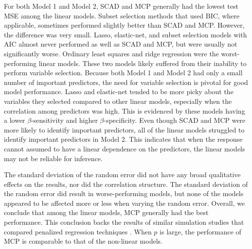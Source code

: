 \documentclass{article}
\begin{document}
	For both Model 1 and Model 2, SCAD and MCP generally had the lowest test MSE among the linear models. Subset selection methods that used BIC, where applicable, sometimes performed slightly better than SCAD and MCP. However, the difference was very small. Lasso, elastic-net, and subset selection models with AIC almost never performed as well as SCAD and MCP, but were usually not significantly worse. Ordinary least squares and ridge regression were the worst-performing linear models. These two models likely suffered from their inability to perform variable selection. Because both Model 1 and Model 2 had only a small number of important predictors, the need for variable selection is pivotal for good model performance. Lasso and elastic-net tended to be more picky about the variables they selected compared to other linear models, especially when the correlation among predictors was high. This is evidenced by these models having a lower $\beta$-sensitivity and higher $\beta$-specificity. Even though SCAD and MCP were more likely to identify important predictors, all of the linear models struggled to identify important predictors in Model 2. This indicates that when the response cannot assumed to have a linear dependence on the predictors, the linear models may not be reliable for inference.
	
	The standard deviation of the random error did not have any broad qualitative effects on the results, nor did the correlation structure. The standard deviation of the random error did result in worse-performing models, but none of the models appeared to be affected more or less when varying the random error. Overall, we conclude that among the linear models, MCP generally had the best performance. This conclusion backs the results of similar simulation studies that compared penalized regression techniques \cite{breheny2011coordinate, zhang2010nearly}. When $p$ is large, the performance of MCP is comparable to that of the non-linear models.
	
\end{document}
